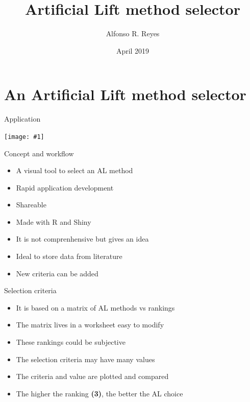 \documentclass[14pt,ignorenonframetext,]{beamer}
\title{Artificial Lift method selector}
\author{Alfonso R. Reyes}
\date{April 2019}
\providecommand{\tightlist}{%
  \setlength{\itemsep}{0pt}\setlength{\parskip}{0pt}}
\def\fullwidth#1{\vspace*{-0.2cm}\par\centerline{\texttt{[image: \#1]}}}
\begin{document}
\frame{\titlepage}

\hypertarget{an-artificial-lift-method-selector}{%
\section{An Artificial Lift method
selector}\label{an-artificial-lift-method-selector}}

\begin{frame}{Application}
\protect\hypertarget{application}{}

\fullwidth{al_selection_tool}

\end{frame}

\begin{frame}{Concept and workflow}
\protect\hypertarget{concept-and-workflow}{}

\begin{itemize}
\tightlist
\item
  A visual tool to select an AL method
\item
  Rapid application development
\item
  Shareable
\item
  Made with R and Shiny
\item
  It is not comprenhensive but gives an idea
\item
  Ideal to store data from literature
\item
  New criteria can be added
\end{itemize}

\end{frame}

\begin{frame}{Selection criteria}
\protect\hypertarget{selection-criteria}{}

\begin{itemize}
\tightlist
\item
  It is based on a matrix of AL methods vs rankings
\item
  The matrix lives in a worksheet easy to modify
\item
  These rankings could be subjective
\item
  The selection criteria may have many values
\item
  The criteria and value are plotted and compared
\item
  The higher the ranking \textbf{(3)}, the better the AL choice
\end{itemize}

\end{frame}
\end{document}
